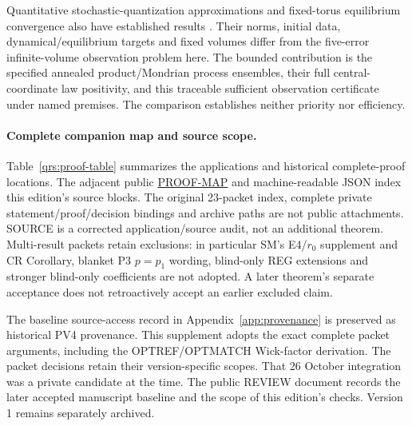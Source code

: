 \documentclass[11pt]{article}
\theoremstyle{plain}
\theoremstyle{definition}
\theoremstyle{remark}
\begin{document}
Quantitative stochastic-quantization approximations and fixed-torus
equilibrium convergence also have established results
\cite{MaZhu2020Galerkin,MaWangYang2024FullDiscrete,TsatsoulisWeber2018Gap}.
Their norms, initial data, dynamical/equilibrium targets and fixed volumes
differ from the five-error infinite-volume observation problem here.
The bounded contribution is the specified annealed product/Mondrian
process ensembles, their full central-coordinate law positivity, and
this traceable sufficient observation certificate under named premises.
The comparison establishes neither priority nor efficiency.

\paragraph{Complete companion map and source scope.}
Table~\ref{qrs:proof-table} summarizes the applications and historical
complete-proof locations. The adjacent public
\href{run:PROOF-MAP.md}{PROOF-MAP} and machine-readable JSON index this
edition's source blocks. The original 23-packet index, complete private
statement/proof/decision bindings and archive paths are not public attachments. SOURCE is a corrected application/source audit, not an
additional theorem. Multi-result packets retain exclusions: in particular
SM's E4/$r_0$ supplement and CR Corollary, blanket P3 $p=p_1$ wording,
blind-only REG extensions and stronger blind-only coefficients are not
adopted. A later theorem's separate acceptance does not retroactively
accept an earlier excluded claim.

The baseline source-access record in Appendix~\ref{app:provenance} is
preserved as historical PV4 provenance. This supplement adopts the exact
complete packet arguments, including the OPTREF/OPTMATCH Wick-factor derivation.
The packet decisions retain their version-specific scopes. That 26 October
integration was a private candidate at the time. The public REVIEW document
records the later accepted manuscript baseline and the scope of this edition's
checks. Version 1 remains separately archived.
\end{document}
